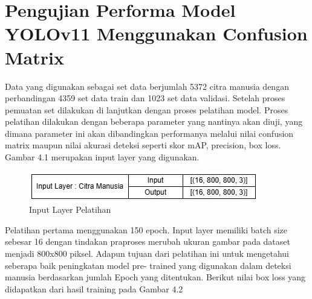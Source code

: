 \section{Pengujian Performa Model YOLOv11 Menggunakan Confusion Matrix}
Data yang digunakan sebagai set data berjumlah 5372 citra manusia dengan perbandingan 4359 set data train dan 1023 set data validasi. Setelah proses pemuatan set dilakukan di lanjutkan dengan proses pelatihan model.
Proses pelatihan dilakukan dengan beberapa parameter yang nantinya akan diuji, yang dimana parameter ini akan dibandingkan performanya melalui nilai confusion matrix maupun nilai akurasi deteksi seperti skor mAP, precision, box loss.
Gambar 4.1 merupakan input layer yang digunakan.
\begin{figure} [H] \centering
  \includegraphics[scale=0.65]{gambar/Input layer.jpg}
  \caption{Input Layer Pelatihan}
  \label{fig:Pengujian Performa}
\end{figure}
Pelatihan pertama menggunakan 150 epoch. Input layer memiliki batch size sebesar 16 dengan tindakan praproses merubah ukuran gambar pada dataset menjadi 800x800 piksel. Adapun tujuan dari pelatihan ini untuk mengetahui seberapa baik peningkatan model pre- trained
yang digunakan dalam deteksi manusia berdasarkan jumlah Epoch yang ditentukan. Berikut nilai box loss yang didapatkan dari hasil training pada Gambar 4.2
